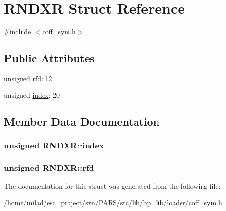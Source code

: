\hypertarget{structRNDXR}{
\section{RNDXR Struct Reference}
\label{structRNDXR}
}


{\ttfamily \#include $<$coff\_\-sym.h$>$}

\subsection*{Public Attributes}
\begin{DoxyCompactItemize}
\item 
unsigned \hyperlink{structRNDXR_ae6e0ba398f69cf42776984d2a02c7d54}{rfd}: 12
\item 
unsigned \hyperlink{structRNDXR_ad3aa04f3fd51c824337fe7b304c8e38b}{index}: 20
\end{DoxyCompactItemize}


\subsection{Member Data Documentation}
\hypertarget{structRNDXR_ad3aa04f3fd51c824337fe7b304c8e38b}{
\subsubsection[{index}]{\setlength{\rightskip}{0pt plus 5cm}unsigned {\bf RNDXR::index}}}
\label{structRNDXR_ad3aa04f3fd51c824337fe7b304c8e38b}
\hypertarget{structRNDXR_ae6e0ba398f69cf42776984d2a02c7d54}{
\subsubsection[{rfd}]{\setlength{\rightskip}{0pt plus 5cm}unsigned {\bf RNDXR::rfd}}}
\label{structRNDXR_ae6e0ba398f69cf42776984d2a02c7d54}


The documentation for this struct was generated from the following file:\begin{DoxyCompactItemize}
\item 
/home/milad/esc\_\-project/svn/PARS/src/lib/bp\_\-lib/loader/\hyperlink{coff__sym_8h}{coff\_\-sym.h}\end{DoxyCompactItemize}
